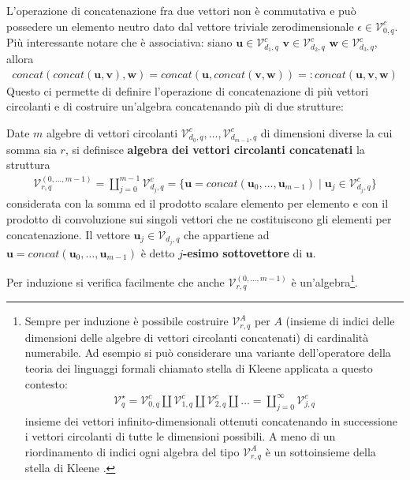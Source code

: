 L'operazione di concatenazione fra due vettori non è commutativa e può possedere un elemento neutro dato dal vettore triviale zerodimensionale $\epsilon \in \mathcal{V}_{0, q}^{c} $. Più interessante notare che è associativa: siano  $\mathbf{u} \in \mathcal{V}_{d_{1}, q}^{c} $  $\mathbf{v} \in \mathcal{V}_{d_{2}, q}^{c} $  $\mathbf{w} \in \mathcal{V}_{d_{3}, q}^{c} $, allora
\begin{align*}
      concat( concat(\mathbf{u},\mathbf{v}),\mathbf{w} ) 
      = concat( \mathbf{u},concat( \mathbf{v},\mathbf{w} )) =: concat(\mathbf{u}, \mathbf{v},\mathbf{w}) 
\end{align*}
Questo ci permette di definire l'operazione di concatenazione di più vettori circolanti e di costruire un'algebra concatenando più di due strutture:
\begin{definizione}
   Date $m$ algebre di vettori circolanti $\mathcal{V}_{d_{0}, q}^{c} ,\dots , \mathcal{V}_{d_{m-1}, q}^{c} $ di dimensioni diverse la cui somma sia $r$, si definisce {\bf algebra dei vettori circolanti concatenati} la struttura 
   \begin{align*}
      \mathcal{V}_{r,q}^{(0,\dots , m-1)} =  \coprod_{j=0}^{m-1} \mathcal{V}_{d_{j}, q}^{c} 
      = \lbrace \mathbf{u} = concat(\mathbf{u}_{0}, \dots , \mathbf{u}_{m-1}) \mid \mathbf{u}_{j} \in \mathcal{V}_{d_{j}, q}^{c} \rbrace
   \end{align*}
   considerata con la somma ed il prodotto scalare elemento per elemento e con il prodotto di convoluzione sui singoli vettori che ne costituiscono gli elementi per concatenazione. Il vettore $\mathbf{u}_{j} \in \mathcal{V}_{d_{j},q}$ che appartiene ad $\mathbf{u} = concat(\mathbf{u}_{0}, \dots , \mathbf{u}_{m-1}) $ è detto {\bf $j$-esimo sottovettore} di $\mathbf{u}$. 
\end{definizione}
\noindent
Per induzione si verifica facilmente che anche $\mathcal{V}_{r,q}^{(0,\dots , m-1)}$ è un'algebra\footnote{Sempre per induzione è possibile costruire $\mathcal{V}_{r,q}^{A}$ per $A$ (insieme di indici delle dimensioni delle algebre di vettori circolanti concatenati) di cardinalità numerabile. Ad esempio si può considerare una variante dell'operatore della teoria dei linguaggi formali chiamato stella di Kleene applicata a questo contesto:
\begin{align*}
   \mathcal{V}_{q}^{\star} 
   = \mathcal{V}_{0, q}^{c} \coprod \mathcal{V}_{1, q}^{c} \coprod \mathcal{V}_{2, q}^{c}\coprod \dots 
   = \coprod_{j =0 }^{\infty} \mathcal{V}_{j, q}^{c} 
\end{align*}
insieme dei vettori infinito-dimensionali ottenuti concatenando in successione i vettori circolanti di tutte le dimensioni possibili. A meno di un riordinamento di indici ogni algebra del tipo $\mathcal{V}_{r,q}^{A}$ è un sottoinsieme della stella di Kleene \cite{difebbraro}.
}.\\
